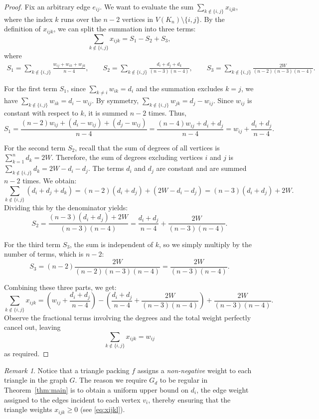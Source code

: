 \documentclass[11pt,reqno]{amsart}
\theoremstyle{definition}
\theoremstyle{remark}
\newtheorem{remark}[theorem]{Remark}
\renewcommand\geq{\geqslant}
\begin{document}
\begin{proof}
Fix an arbitrary edge $e_{ij}$. We want to evaluate the sum $\sum_{k \notin \{i,j\}} x_{ijk}$, where the index $k$ runs over the $n-2$ vertices in $V(K_n) \setminus \{i, j\}$. By the definition of $x_{ijk}$, we can split the summation into three terms:
$$ \sum_{k \notin \{i,j\}} x_{ijk} = S_1 - S_2 + S_3, $$
where
\begin{align*}
S_1 = \sum_{k\notin \{i,j\}} \frac{w_{ij} + w_{ik} + w_{jk}}{n-4},\qquad   S_2 = \sum_{k\notin \{i,j\}} \frac{d_i + d_j + d_k}{(n-3)(n-4)}, \qquad   S_3 = \sum_{k\notin \{i,j\}} \frac{2W}{(n-2)(n-3)(n-4)}.   
\end{align*}

For the first term $S_1$, since $\sum_{k\neq i} w_{ik} = d_i$ and the summation excludes $k=j$, we have $\sum_{k \notin \{i,j\}} w_{ik} = d_i - w_{ij}$. By symmetry, $\sum_{k \notin \{i,j\}} w_{jk} = d_j - w_{ij}$. Since $w_{ij}$ is constant with respect to $k$, it is summed $n-2$ times. Thus,
$$ S_1 = \frac{(n-2)w_{ij} + (d_i - w_{ij}) + (d_j - w_{ij})}{n-4} = \frac{(n-4)w_{ij} + d_i + d_j}{n-4} = w_{ij} + \frac{d_i + d_j}{n-4}. $$

For the second term $S_2$, recall that the sum of degrees of all vertices is $\sum_{k=1}^n d_k = 2W$. Therefore, the sum of degrees excluding vertices $i$ and $j$ is $\sum_{k \notin \{i,j\}} d_k = 2W - d_i - d_j$. The terms $d_i$ and $d_j$ are constant and are summed $n-2$ times. We obtain:
$$ \sum_{k\notin \{i,j\}} (d_i + d_j + d_k) = (n-2)(d_i + d_j) + (2W - d_i - d_j) = (n-3)(d_i + d_j) + 2W. $$
Dividing this by the denominator yields:
$$ S_2 = \frac{(n-3)(d_i + d_j) + 2W}{(n-3)(n-4)} = \frac{d_i + d_j}{n-4} + \frac{2W}{(n-3)(n-4)}. $$

For the third term $S_3$, the sum is independent of $k$, so we simply multiply by the number of terms, which is $n-2$:
$$ S_3 = (n-2) \frac{2W}{(n-2)(n-3)(n-4)} = \frac{2W}{(n-3)(n-4)}. $$

Combining these three parts, we get:
$$ \sum_{k \notin \{i,j\}} x_{ijk} = \left( w_{ij} + \frac{d_i + d_j}{n-4} \right) - \left( \frac{d_i + d_j}{n-4} + \frac{2W}{(n-3)(n-4)} \right) + \frac{2W}{(n-3)(n-4)}. $$
Observe the fractional terms involving the degrees and the total weight perfectly cancel out, leaving
$$ \sum_{k \notin \{i,j\}} x_{ijk} = w_{ij} $$
as required.
\end{proof}

\begin{remark}
Notice that a triangle packing $f$ assigns a \emph{non-negative} weight to each triangle in the graph $G$. The reason we require $G_d$ to be regular in Theorem~\ref{thm:main} is to obtain a uniform upper bound on $d_i$, the edge weight assigned to the edges incident to each vertex $v_i$, thereby ensuring that the triangle weights $x_{ijk} \geq 0$ (see \eqref{eq:xijkl}).
\end{remark}
\end{document}
